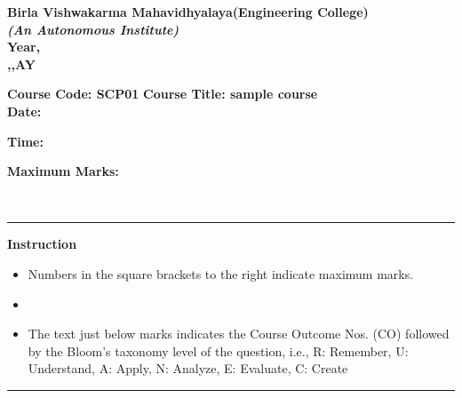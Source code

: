 \documentclass[addpoints]{exam}
\begin{document}
  \begin{large}        
  \begin{center} 
  
  \textbf{Birla Vishwakarma Mahavidhyalaya(Engineering College)} \\
  \textbf{\textit{(An Autonomous Institute)}} \\
  \textbf{ Year, } \\
  \textbf{ ,,AY } \\
  \vspace{4mm}
  
  
  \end{center}
  \end{large}
  \begin{large}
  \textbf{Course Code: SCP01}  
  \hspace{20mm}
  \textbf{Course Title: sample course}\vspace{2mm}\\
  \textbf{Date:} 
  \parbox[t]{37mm}{}
  \textbf{Time:}
  \parbox[t]{37mm}{}
  \textbf{Maximum Marks: }
  \end{large} \\
  \rule{162mm}{0.3mm}
  \textbf{Instruction}
  
  
  \begin{itemize}
      \item Numbers in the square brackets to the right indicate maximum marks.
      \item 
      \item The text just below marks indicates the Course Outcome Nos. (CO) followed by the Bloom’s taxonomy level of the question, i.e., R: Remember, U: Understand, A: Apply, N: Analyze,       E: Evaluate, C: Create
  \end{itemize}
  \rule{162mm}{0.3mm}
  \begin{questions}
\pointname{}
\pointsinrightmargin
\pointformat{\parbox[t]{16pt}{\text{[\thepoints]}}}
\end{questions}
\end{document}
